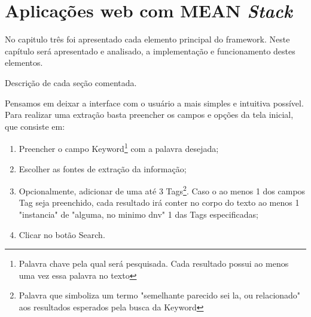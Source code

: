 \chapter{Aplicações web com MEAN \textit{Stack}}	 
\label{implementacao}


    No capitulo três foi apresentado cada elemento principal do framework. Neste capítulo será apresentado e analisado, a implementação e funcionamento destes elementos.

Descrição de cada seção comentada.

  
    

Pensamos em deixar a interface com o usuário a mais simples e intuitiva possível.
Para realizar uma extração basta preencher os campos e opções da tela inicial, que consiste em:
\begin{enumerate}
    \item Preencher o campo Keyword\footnote{Palavra chave pela qual será pesquisada. Cada resultado possui ao menos uma vez essa palavra no texto} com a palavra desejada;
    \item Escolher as fontes de extração da informação;
    \item Opcionalmente, adicionar de uma até 3 Tags\footnote{Palavra que simboliza um termo "semelhante parecido sei la, ou relacionado" aos resultados esperados pela busca da Keyword}. Caso o ao menos 1 dos campos Tag seja preenchido, cada resultado irá conter no corpo do texto ao menos 1 "instancia" de "alguma, no minimo dnv" 1 das Tags especificadas;
    \item Clicar no botão Search.
\end{enumerate}

